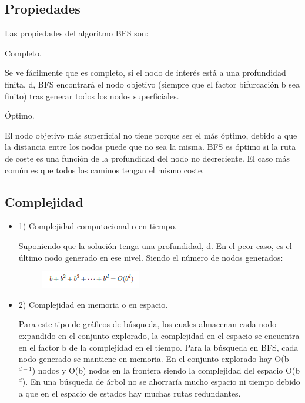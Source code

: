 \documentclass[conference]{IEEEtran}
\begin{document}
\subsection{Propiedades}    %


Las propiedades del algoritmo BFS son:

{\setlength{\parskip}{1em}
\begin{itemize}


\item Completo. 


Se ve f\'acilmente que es completo, si el nodo de inter\'es est\'a a una profundidad finita, d, BFS encontrará el nodo objetivo (siempre que el factor bifurcaci\'on b sea finito) tras generar todos los nodos superficiales.


{\setlength{\parskip}{1em}

\item \'Optimo. 


El nodo objetivo m\'as superficial no tiene porque ser el m\'as \'optimo, debido a que la distancia entre los nodos puede que no sea la misma. BFS es \'optimo si la ruta de coste es una función de la profundidad del nodo no decreciente. El caso m\'as com\'un es que todos los caminos tengan el mismo coste.
}


\end{itemize}
}

\subsection{Complejidad}
{\setlength{\parskip}{1em}
\begin{itemize}

\item 1)	Complejidad computacional o en tiempo. 

Suponiendo que la soluci\'on tenga una profundidad, d. En el peor caso, es el \'ultimo nodo generado en ese nivel. Siendo el número de nodos generados:

\begin{figure}[H]
\centerline{\includegraphics[scale=1]{IMAGENES/ndenodos.png}}
\caption{}
\label{fig}
\end{figure}


\item 2)	Complejidad en memoria o en espacio. 

Para este tipo de gr\'aficos de b\'usqueda, los cuales almacenan cada nodo expandido en el conjunto explorado, la complejidad en el espacio se encuentra en el factor b de la complejidad en el tiempo. Para la b\'usqueda en BFS, cada nodo generado se mantiene en memoria. En el conjunto explorado hay O(b$^{d-1}$) nodos y O(b) nodos en la frontera siendo la complejidad del espacio O(b$^{d}$). En una b\'usqueda de \'arbol no se ahorrar\'ia mucho espacio ni tiempo debido a que en el espacio de estados hay muchas rutas redundantes.

\end{itemize}
}
\end{document}
